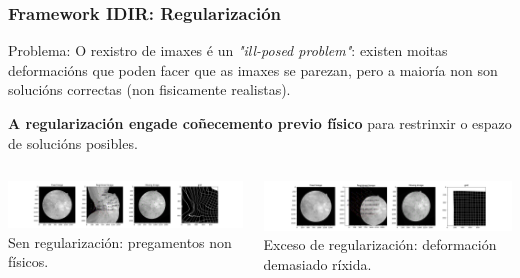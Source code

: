 \documentclass[xcolor=dvipsnames]{beamer}
\begin{document}
\begin{frame}
    \frametitle{Framework IDIR: Regularización}
    
    \begin{block}{Problema:}
        O rexistro de imaxes é un \textit{"ill-posed problem"}: existen moitas deformacións que poden facer que as imaxes se parezan, pero a maioría non son solucións correctas (non fisicamente realistas).
        \vspace{0.2cm}
        
        \textbf{A regularización engade coñecemento previo físico} para restrinxir o espazo de solucións posibles.
    \end{block}
    
    \begin{columns}
        \begin{column}{0.6\textwidth}
            \centering
            \includegraphics[width=\textwidth]{../imaxes/reg_examples/no_reg_example.png}
            \small{Sen regularización: pregamentos non físicos.}
        \end{column}
        \begin{column}{0.6\textwidth}
            \centering
            \includegraphics[width=\textwidth]{../imaxes/reg_examples/too_much_reg_example.png}
            \small{Exceso de regularización: deformación demasiado ríxida.}
        \end{column}
    \end{columns}
    
\end{frame}
\end{document}
